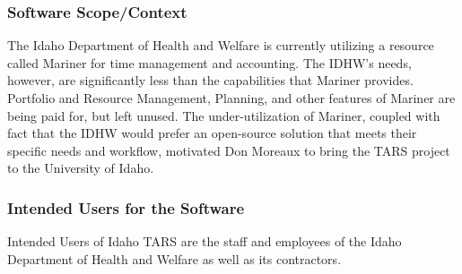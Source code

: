 \documentclass[letterpaper]{article}
\begin{document}
\subsubsection{Software Scope/Context}
The Idaho Department of Health and Welfare is currently utilizing a resource called Mariner for time management and accounting. The IDHW's needs, however, are significantly less than the capabilities that Mariner provides. Portfolio and Resource Management, Planning, and other features of Mariner are being paid for, but left unused. The under-utilization of Mariner, coupled with fact that the IDHW would prefer an open-source solution that meets their specific needs and workflow, motivated Don Moreaux to bring the TARS project to the University of Idaho. 

\subsubsection{Intended Users for the Software}
Intended Users of Idaho TARS are the staff and employees of the Idaho Department of Health and Welfare as well as its contractors.
\end{document}
